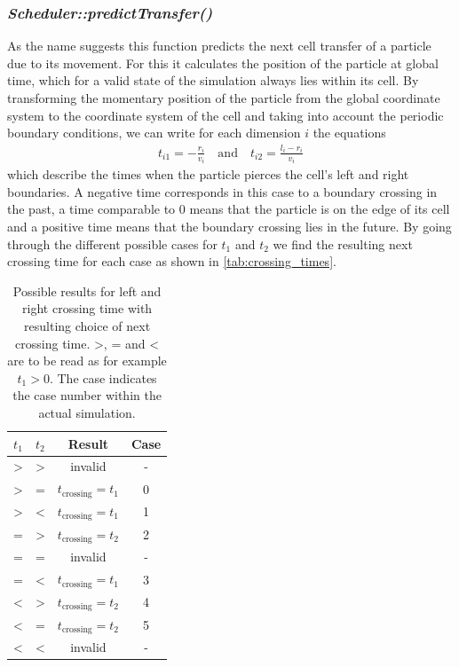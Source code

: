 \subsubsection{\quad \textit{Scheduler::predictTransfer()}}
As the name suggests this function predicts the next cell transfer of a particle due to its movement. For this it calculates the position of the particle at global time, which for a valid state of the simulation always lies within its cell. By transforming the momentary position of the particle from the global coordinate system to the coordinate system of the cell and taking into account the periodic boundary conditions, we can write for each dimension $i$ the equations
\begin{align}
t_{i1}=-\frac{r_i}{v_i} \quad \text{and} \quad t_{i2}=\frac{l_i-r_i}{v_i}
\end{align}
which describe the times when the particle pierces the cell's left and right boundaries. A negative time corresponds in this case to a boundary crossing in the past, a time comparable to 0 means that the particle is on the edge of its cell and a positive time means that the boundary crossing lies in the future. By going through the different possible cases for $t_1$ and $t_2$ we find the resulting next crossing time for each case as shown in \autoref{tab:crossing_times}.
\begin{table}[h]
\centering
\begin{tabular}{c|c||c|c}
$t_1$ & $t_2$ & Result & Case \\ \hline
> & > & invalid & - \\ \hline
> & = & $t_{\text{crossing}} = t_1$ & 0 \\ \hline
> & < & $t_{\text{crossing}} = t_1$ & 1 \\ \hline
= & > & $t_{\text{crossing}} = t_2$ & 2\\ \hline
= & = & invalid & - \\ \hline
= & < & $t_{\text{crossing}} = t_1$ & 3 \\ \hline
< & > & $t_{\text{crossing}} = t_2$ & 4 \\ \hline
< & = & $t_{\text{crossing}} = t_2$ & 5\\ \hline
< & < & invalid & - \\ \hline
\end{tabular}
\caption{Possible results for left and right crossing time with resulting choice of next crossing time. >, = and < are to be read as for example $t_1 > 0$. The case indicates the case number within the actual simulation.}
\label{tab:crossing_times}
\end{table}


